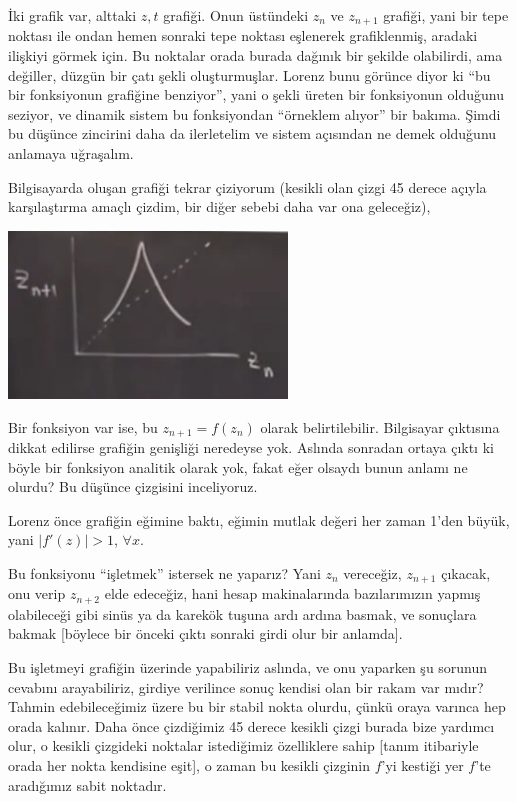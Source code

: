 \documentclass[12pt,fleqn]{article}\usepackage{../../common}
\begin{document}
İki grafik var, alttaki $z,t$ grafiği. Onun üstündeki $z_n$ ve $z_{n+1}$
grafiği, yani bir tepe noktası ile ondan hemen sonraki tepe noktası
eşlenerek grafiklenmiş, aradaki ilişkiyi görmek için. Bu noktalar orada
burada dağınık bir şekilde olabilirdi, ama değiller, düzgün bir çatı şekli
oluşturmuşlar. Lorenz bunu görünce diyor ki ``bu bir fonksiyonun grafiğine
benziyor'', yani o şekli üreten bir fonksiyonun olduğunu seziyor, ve
dinamik sistem bu fonksiyondan ``örneklem alıyor'' bir bakıma. Şimdi bu
düşünce zincirini daha da ilerletelim ve sistem açısından ne demek olduğunu
anlamaya uğraşalım.

Bilgisayarda oluşan grafiği tekrar çiziyorum (kesikli olan çizgi 45 derece
açıyla karşılaştırma amaçlı çizdim, bir diğer sebebi daha var ona
geleceğiz),

\includegraphics[width=20em]{18_08.png}

Bir fonksiyon var ise, bu $z_{n+1}=f(z_n)$ olarak
belirtilebilir. Bilgisayar çıktısına dikkat edilirse grafiğin genişliği
neredeyse yok. Aslında sonradan ortaya çıktı ki böyle bir fonksiyon
analitik olarak yok, fakat eğer olsaydı bunun anlamı ne olurdu? Bu düşünce
çizgisini inceliyoruz.

Lorenz önce grafiğin eğimine baktı, eğimin mutlak değeri her zaman 1'den
büyük, yani $|f'(z)| > 1$, $\forall x$. 

Bu fonksiyonu ``işletmek'' istersek ne yaparız? Yani $z_{n}$ vereceğiz,
$z_{n+1}$ çıkacak, onu verip $z_{n+2}$ elde edeceğiz, hani hesap
makinalarında bazılarımızın yapmış olabileceği gibi sinüs ya da karekök
tuşuna ardı ardına basmak, ve sonuçlara bakmak [böylece bir önceki çıktı
sonraki girdi olur bir anlamda].

Bu işletmeyi grafiğin üzerinde yapabiliriz aslında, ve onu yaparken şu
sorunun cevabını arayabiliriz, girdiye verilince sonuç kendisi olan bir
rakam var mıdır? Tahmin edebileceğimiz üzere bu bir stabil nokta olurdu,
çünkü oraya varınca hep orada kalınır. Daha önce çizdiğimiz 45 derece
kesikli çizgi burada bize yardımcı olur, o kesikli çizgideki noktalar
istediğimiz özelliklere sahip [tanım itibariyle orada her nokta kendisine
eşit], o zaman bu kesikli çizginin $f$'yi kestiği yer $f$'te aradığımız
sabit noktadır.
\end{document}
